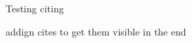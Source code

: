 Testing citing ~\cite{4799375}

addign cites to get them visible in the end
~\cite{5464831}
~\cite{5583037}
~\cite{5583094}
~\cite{5710601}
~\cite{5739529}
~\cite{6081486}
~\cite{6116319}
~\cite{6411890}
~\cite{6467556}
~\cite{6625056}
~\cite{6705673}
~\cite{5605523}
~\cite{5290984}
~\cite{1203346}
~\cite{4803123}
~\cite{4799318}
~\cite{5381595}
~\cite{6229729}
~\cite{4347144}
~\cite{1247211}




